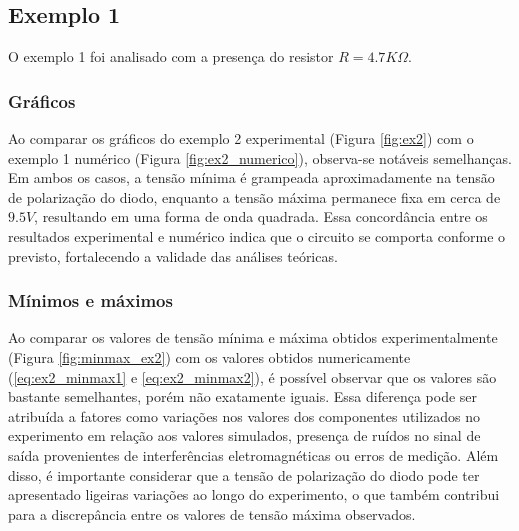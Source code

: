 \subsection{Exemplo 1}

O exemplo 1 foi analisado com a presença do resistor $R = 4.7K \Omega$.

\subsubsection{Gráficos}

Ao comparar os gráficos do exemplo 2 experimental (Figura \ref{fig:ex2}) com o exemplo 1 numérico (Figura \ref{fig:ex2_numerico}), observa-se notáveis semelhanças. Em ambos os casos, a tensão mínima é grampeada aproximadamente na tensão de polarização do diodo, enquanto a tensão máxima permanece fixa em cerca de $9.5V$, resultando em uma forma de onda quadrada. Essa concordância entre os resultados experimental e numérico indica que o circuito se comporta conforme o previsto, fortalecendo a validade das análises teóricas.

\subsubsection{Mínimos e máximos}

Ao comparar os valores de tensão mínima e máxima obtidos experimentalmente (Figura \ref{fig:minmax_ex2}) com os valores obtidos numericamente (\ref{eq:ex2_minmax1} e \ref{eq:ex2_minmax2}), é possível observar que os valores são bastante semelhantes, porém não exatamente iguais. Essa diferença pode ser atribuída a fatores como variações nos valores dos componentes utilizados no experimento em relação aos valores simulados, presença de ruídos no sinal de saída provenientes de interferências eletromagnéticas ou erros de medição. Além disso, é importante considerar que a tensão de polarização do diodo pode ter apresentado ligeiras variações ao longo do experimento, o que também contribui para a discrepância entre os valores de tensão máxima observados.